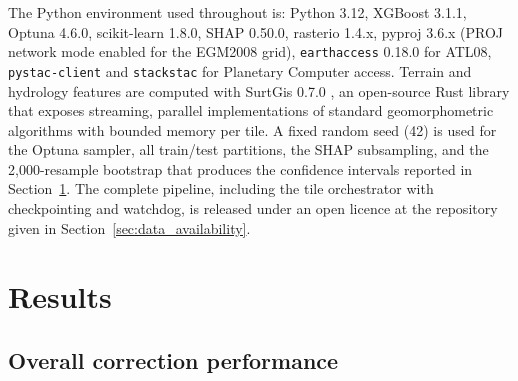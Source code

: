 \documentclass[preprint,authoryear,number]{elsarticle}
\begin{document}
The Python environment used throughout is: Python 3.12, XGBoost 3.1.1, Optuna 4.6.0, scikit-learn 1.8.0, SHAP 0.50.0, rasterio 1.4.x, pyproj 3.6.x (PROJ network mode enabled for the EGM2008 grid), \texttt{earthaccess} 0.18.0 for ATL08, \texttt{pystac-client} and \texttt{stackstac} for Planetary Computer access. Terrain and hydrology features are computed with SurtGis 0.7.0 \citep{SurtGis2026}, an open-source Rust library that exposes streaming, parallel implementations of standard geomorphometric algorithms with bounded memory per tile. A fixed random seed (42) is used for the Optuna sampler, all train/test partitions, the SHAP subsampling, and the 2{,}000-resample bootstrap that produces the confidence intervals reported in Section~\ref{sec:results}. The complete pipeline, including the tile orchestrator with checkpointing and watchdog, is released under an open licence at the repository given in Section~\ref{sec:data_availability}.


\section{Results}
\label{sec:results}

\subsection{Overall correction performance}
\label{sec:overall_performance}
\end{document}
